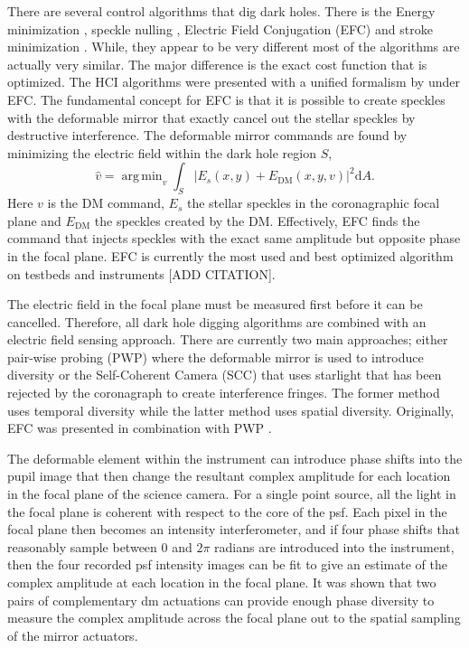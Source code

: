 \documentclass[letterpaper]{ar-1col}
\DeclareMathOperator*{\argmin}{arg\,min}
\begin{document}
There are several control algorithms that dig dark holes. There is the Energy minimization \citep{borde2006high}, speckle nulling \citep{martinache2012speckle, martinache2014sky}, Electric Field Conjugation (EFC) \citep{Giveon09} and stroke minimization \citep{pueyo2009optimal}. While, they appear to be very different most of the algorithms are actually very similar. The major difference is the exact cost function that is optimized. The HCI algorithms were presented with a unified formalism by \citet{Giveon09,Giveon10} under EFC. The fundamental concept for EFC is that it is possible to create speckles with the deformable mirror that exactly cancel out the stellar speckles by destructive interference. The deformable mirror commands are found by minimizing the electric field within the dark hole region $S$,
\begin{equation}
    \hat{v} = \argmin_v \int_S |E_{s}(x,y) + E_{\mathrm{DM}}(x, y, v)|^2\mathrm{d}A.
\end{equation}
Here $v$ is the DM command, $E_{s}$ the stellar speckles in the coronagraphic focal plane and $E_{\mathrm{DM}}$ the speckles created by the DM. Effectively, EFC finds the command that injects speckles with the exact same amplitude but opposite phase in the focal plane. EFC is currently the most used and best optimized algorithm on testbeds and instruments [ADD CITATION].

The electric field in the focal plane must be measured first before it can be cancelled. Therefore, all dark hole digging algorithms are combined with an electric field sensing approach. There are currently two main approaches; either pair-wise probing (PWP) where the deformable mirror is used to introduce diversity or the Self-Coherent Camera (SCC) that uses starlight that has been rejected by the coronagraph to create interference fringes. The former method uses temporal diversity while the latter method uses spatial diversity. Originally, EFC was presented in combination with PWP \citep{Giveon09}.

The deformable element within the instrument can introduce phase shifts into the pupil image that then change the resultant complex amplitude for each location in the focal plane of the science camera. For a single point source, all the light in the focal plane is coherent with respect to the core of the \ac{psf}. Each pixel in the focal plane then becomes an intensity interferometer, and if four phase shifts that reasonably sample between $0$ and $2\pi$ radians are introduced into the instrument, then the four recorded \ac{psf} intensity images can be fit to give an estimate of the complex amplitude at each location in the focal plane. It was shown that two pairs of complementary \ac{dm} actuations can provide enough phase diversity to measure the complex amplitude across the focal plane out to the spatial sampling of the mirror actuators.
\end{document}
